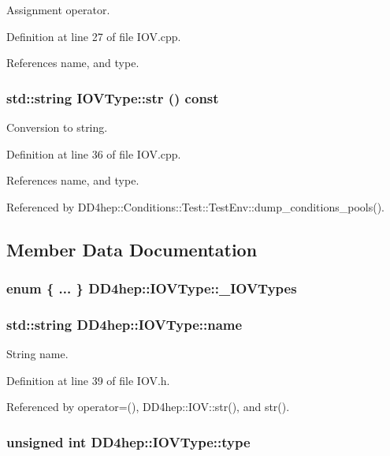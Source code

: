 Assignment operator. 

Definition at line 27 of file IOV.cpp.

References name, and type.\hypertarget{class_d_d4hep_1_1_i_o_v_type_a54ef1c5550df3ff0d35f9daaf5262e50}{
\subsubsection[{str}]{\setlength{\rightskip}{0pt plus 5cm}std::string IOVType::str () const}}
\label{class_d_d4hep_1_1_i_o_v_type_a54ef1c5550df3ff0d35f9daaf5262e50}


Conversion to string. 

Definition at line 36 of file IOV.cpp.

References name, and type.

Referenced by DD4hep::Conditions::Test::TestEnv::dump\_\-conditions\_\-pools().

\subsection{Member Data Documentation}
\hypertarget{class_d_d4hep_1_1_i_o_v_type_a065ca1030c72dec59bd0c6533acaa1da}{
\subsubsection[{\_\-IOVTypes}]{\setlength{\rightskip}{0pt plus 5cm}enum \{ ... \}   {\bf DD4hep::IOVType::\_\-IOVTypes}}}
\label{class_d_d4hep_1_1_i_o_v_type_a065ca1030c72dec59bd0c6533acaa1da}
\hypertarget{class_d_d4hep_1_1_i_o_v_type_ac4fa3d6c589f183137625501e757234e}{
\subsubsection[{name}]{\setlength{\rightskip}{0pt plus 5cm}std::string {\bf DD4hep::IOVType::name}}}
\label{class_d_d4hep_1_1_i_o_v_type_ac4fa3d6c589f183137625501e757234e}


String name. 

Definition at line 39 of file IOV.h.

Referenced by operator=(), DD4hep::IOV::str(), and str().\hypertarget{class_d_d4hep_1_1_i_o_v_type_a8387532d69591a4379b8f84fa2302c5a}{
\subsubsection[{type}]{\setlength{\rightskip}{0pt plus 5cm}unsigned int {\bf DD4hep::IOVType::type}}}
\label{class_d_d4hep_1_1_i_o_v_type_a8387532d69591a4379b8f84fa2302c5a}


